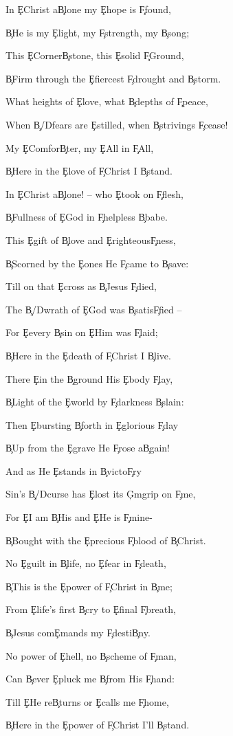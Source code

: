 \documentclass[9pt]{extarticle}
\begin{document}
\bsong

\bv
In \c{E}Christ a\c{B}lone my \c{E}hope is \c{F\s }found,

\c{B}He is my \c{E}light, my \c{F\s }strength, my \c{B}song;

This \c{E}Corner\c{B}stone, this \c{E}solid \c{F\s }Ground,

\c{B}Firm through the \c{E}fiercest \c{F\s }drought and \c{B}storm.

What heights of \c{E}love, what \c{B}depths of \c{F\s }peace,

When \c{B/D\s }fears are \c{E}stilled, when \c{B}strivings \c{F\s }cease!

My \c{E}Comfor\c{B}ter, my \c{E}All in \c{F\s }All,

\c{B}Here in the \c{E}love of \c{F\s }Christ I \c{B}stand.
\ev

\bv
In \c{E}Christ a\c{B}lone! – who \c{E}took on \c{F\s }flesh,

\c{B}Fullness of \c{E}God in \c{F\s }helpless \c{B}babe.

This \c{E}gift of \c{B}love and \c{E}righteous\c{F\s }ness,

\c{B}Scorned by the \c{E}ones He \c{F\s }came to \c{B}save:

Till on that \c{E}cross as \c{B}Jesus \c{F\s }died,

The \c{B/D\s }wrath of \c{E}God was \c{B}satis\c{F\s }fied –

For \c{E}every \c{B}sin on \c{E}Him was \c{F\s }laid;

\c{B}Here in the \c{E}death of \c{F\s }Christ I \c{B}live.
\ev

\bv
There \c{E}in the \c{B}ground His \c{E}body \c{F\s }lay,

\c{B}Light of the \c{E}world by \c{F\s }darkness \c{B}slain:

Then \c{E}bursting \c{B}forth in \c{E}glorious \c{F\s }day

\c{B}Up from the \c{E}grave He \c{F\s }rose a\c{B}gain!

And as He \c{E}stands in \c{B}victo\c{F\s }ry

Sin’s \c{B/D\s }curse has \c{E}lost its \c{G\s m}grip on \c{F\s }me,

For \c{E}I am \c{B}His and \c{E}He is \c{F\s }mine-

\c{B}Bought with the \c{E}precious \c{F\s }blood of \c{B}Christ.
\ev

\bv
No \c{E}guilt in \c{B}life, no \c{E}fear in \c{F\s }death,

\c{B}This is the \c{E}power of \c{F\s }Christ in \c{B}me;

From \c{E}life’s first \c{B}cry to \c{E}final \c{F\s }breath,

\c{B}Jesus com\c{E}mands my \c{F\s }desti\c{B}ny.

No power of \c{E}hell, no \c{B}scheme of \c{F\s }man,

Can \c{B}ever \c{E}pluck me \c{B}from His \c{F\s }hand:

Till \c{E}He re\c{B}turns or \c{E}calls me \c{F\s }home,

\c{B}Here in the \c{E}power of \c{F\s }Christ I’ll \c{B}stand.
\ev

\esong
\end{document}
